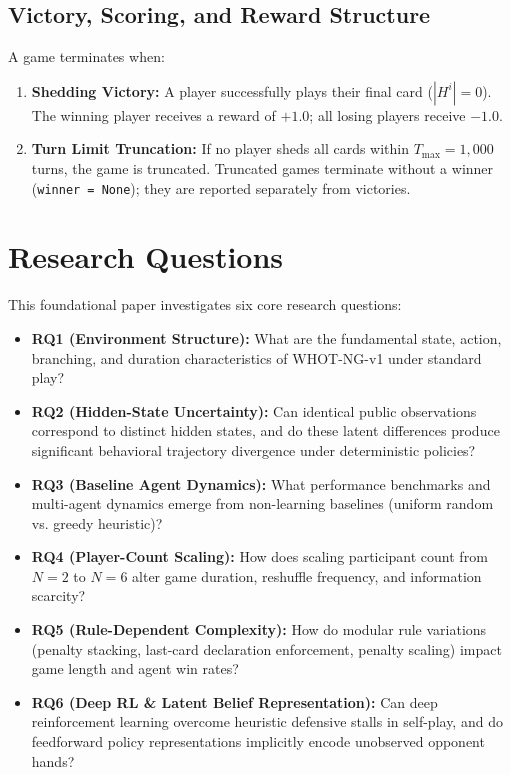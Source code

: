 \documentclass[11pt]{article}
\begin{document}
\subsection{Victory, Scoring, and Reward Structure}
A game terminates when:
\begin{enumerate}
  \item \textbf{Shedding Victory:} A player successfully plays their final card ($|H^i| = 0$). The winning player receives a reward of $+1.0$; all losing players receive $-1.0$.
  \item \textbf{Turn Limit Truncation:} If no player sheds all cards within $T_{\max} = 1,000$ turns, the game is truncated. Truncated games terminate without a winner (\texttt{winner = None}); they are reported separately from victories.
\end{enumerate}


\section{Research Questions}

This foundational paper investigates six core research questions:

\begin{itemize}
  \item \textbf{RQ1 (Environment Structure):} What are the fundamental state, action, branching, and duration characteristics of WHOT-NG-v1 under standard play?
  \item \textbf{RQ2 (Hidden-State Uncertainty):} Can identical public observations correspond to distinct hidden states, and do these latent differences produce significant behavioral trajectory divergence under deterministic policies?
  \item \textbf{RQ3 (Baseline Agent Dynamics):} What performance benchmarks and multi-agent dynamics emerge from non-learning baselines (uniform random vs. greedy heuristic)?
  \item \textbf{RQ4 (Player-Count Scaling):} How does scaling participant count from $N=2$ to $N=6$ alter game duration, reshuffle frequency, and information scarcity?
  \item \textbf{RQ5 (Rule-Dependent Complexity):} How do modular rule variations (penalty stacking, last-card declaration enforcement, penalty scaling) impact game length and agent win rates?
  \item \textbf{RQ6 (Deep RL \& Latent Belief Representation):} Can deep reinforcement learning overcome heuristic defensive stalls in self-play, and do feedforward policy representations implicitly encode unobserved opponent hands?
\end{itemize}
\end{document}
